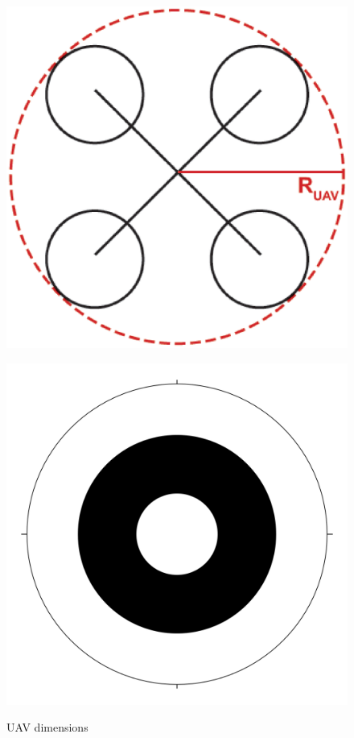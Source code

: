 \documentclass[a4paper,11pt,titlepage]{article}
\begin{document}
\begin{figure}[h]
\centering
\begin{minipage}{.48\textwidth}
  \centering
  \includegraphics[width=1\linewidth]{fig/UAV_dimensions.eps}
  \caption{UAV dimensions}
  \label{fig:UAV_dimensions}
\end{minipage}%
\begin{minipage}{0.48\textwidth}
  \centering
  \includegraphics[width=1\linewidth]{fig/blob.png}
  \label{fig:blob}
\end{minipage}
\end{figure}
\end{document}
